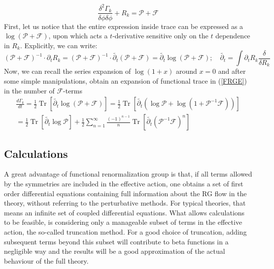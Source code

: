 \documentclass[11pt, a4paper]{article}
\begin{document}
\begin{equation}
    \frac{\delta^2 \Gamma_k}{\delta \phi \delta \phi} + R_k = \mathcal{P} + \mathcal{F}
\end{equation}
First, let us notice that the entire expression inside trace can be expressed as a $\log{(\mathcal{P}+\mathcal{F})}$, upon which acts
a $t$-derivative sensitive only on the $t$ dependence in $R_k$. Explicitly, we can write:
\begin{equation}
    \left(\mathcal{P} + \mathcal{F}\right)^{-1} \cdot \partial_t R_k = \left(\mathcal{P} + \mathcal{F}\right)^{-1} \cdot \widetilde{\partial_t} \left(\mathcal{P}+\mathcal{F}\right) = \widetilde{\partial_t} \log{\left(\mathcal{P}+\mathcal{F}\right)}; \quad \widetilde{\partial_t} = \int \partial_t R_k \frac{\delta}{\delta R_k}
\end{equation}
Now, we can recall the series expansion of $\log{(1+x)}$ around $x=0$ and after some simple manipulations, obtain an expansion of functional trace in (\ref{FRGE}) in
the number of $\mathcal{F}$-terms
\begin{gather}
    \frac{d \Gamma_k}{dt} = \frac{1}{2} \operatorname{Tr} \left[ \widetilde{\partial_t} \log{\left(\mathcal{P}+\mathcal{F}\right)} \right] = \frac{1}{2} \operatorname{Tr} \left[ \widetilde{\partial_t} \left(\log{\mathcal{P}} + \log{(1+\mathcal{P}^{-1}\mathcal{F})}\right) \right] \\ =  \frac{1}{2} \operatorname{Tr} \left[ \widetilde{\partial_t} \log{\mathcal{P}} \right] + \frac{1}{2} \sum_{n=1}^{\infty} \frac{(-1)^{n-1}}{n} \operatorname{Tr}\left[\widetilde{\partial_t}\left(\mathcal{P}^{-1}\mathcal{F}\right)^n\right]
\end{gather}

\subsection{Calculations}

A great advantage of functional renormalization group is that, if all terms
allowed by the symmetries are included in the effective action, one obtains a set of first order
differential equations containing full information about the RG flow in the theory, without referring to the perturbative methods.
For typical theories, that means an infinite set of coupled differential equations.
What allows calculations to be feasible, is considering only a manageable subset of terms in the effective action, the so-called truncation method.
For a good choice of truncation, adding subsequent terms beyond this subset will contribute to beta functions in a negligible way
and the results will be a good approximation of the actual behaviour of the full theory.
\end{document}
